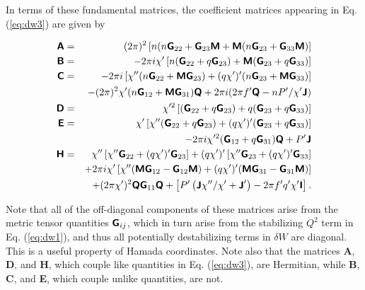 \documentclass[prb,twocolumn,showpacs,preprintnumbers,amsmath,amssymb]{revtex4}
\renewcommand*{\t}[1]{\hbox{\sffamily\bfseries #1}}
\begin{document}
In terms of these fundamental matrices, the coefficient matrices
appearing in Eq. (\ref{eq:dw3}) are given by
\begin{widetext}
\begin{eqnarray}
\t{A} =&& (2 \pi)^2 \left[ n (n \t{G}_{22} + \t{G}_{23} \t{M}
	+\t{M} (n \t{G}_{23} + \t{G}_{33} \t{M})  \right] \nonumber \\
\t{B} =&& -2 \pi i \chi' \left[ n (\t{G}_{22} + q \t{G}_{23} )
	+ \t{M} (\t{G}_{23} + q \t{G}_{33})  \right] \nonumber \\
\t{C} =&& -2 \pi i \left[  \chi'' (n \t{G}_{22} + \t{M} \t{G}_{23})
	+ (q \chi')' (n \t{G}_{23} + \t{M} \t{G}_{33})  \right] \nonumber \\
	&& - (2 \pi)^2 \chi' (n \t{G}_{12} + \t{M} \t{G}_{31}) \t{Q}
	+ 2 \pi i (2 \pi f' \t{Q} - n P'/\chi' \t{J}) \nonumber \\
\t{D} =&& \chi'^2 \left[ (\t{G}_{22} + q \t{G}_{23})
	+ q(\t{G}_{23} + q \t{G}_{33}) \right] \nonumber \\
\t{E} =&& \chi' \left[  \chi'' (\t{G}_{22} + q \t{G}_{23})
	+ (q \chi')' (\t{G}_{23} + q \t{G}_{33}) \right] \nonumber \\
	&& - 2 \pi i \chi'^2 (\t{G}_{12} + q \t{G}_{31}) \t{Q}
	+ P' \t{J} \nonumber \\
\t{H} =&& \chi''\left[ \chi'' \t{G}_{22} + (q \chi')' \t{G}_{23} \right]
	+ (q \chi')'\left[ \chi'' \t{G}_{23} 
	+ (q \chi')' \t{G}_{33} \right] \nonumber \\
	&& + 2 \pi i \chi' \left[ \chi'' (\t{M} \t{G}_{12} - \t{G}_{12} \t{M})
	+ (q \chi')' (\t{M} \t{G}_{31} - \t{G}_{31} \t{M})  \right] \nonumber \\
	&& + (2 \pi \chi')^2 \t{Q} \t{G}_{11} \t{Q}
	+ \left[ P' \left(  \t{J} \chi''/\chi' + \t{J}' \right) 
	-2 \pi f' q' \chi' \t{I} \right].
\label{eq:define_a-h}
\end{eqnarray}
\end{widetext}
Note that all of the off-diagonal components of these matrices arise
from the metric tensor quantities $\t{G}_{ij}$, which in turn arise from
the stabilizing $Q^2$ term in Eq. (\ref{eq:dw1}), and thus all
potentially destabilizing terms in $\delta W$ are diagonal.  This is a
useful property of Hamada coordinates.  Note also that the matrices
\t{A}, \t{D}, and \t{H}, which couple like quantities in
Eq. (\ref{eq:dw3}), are Hermitian, while \t{B}, \t{C}, and \t{E}, which
couple unlike quantities, are not.
\end{document}
